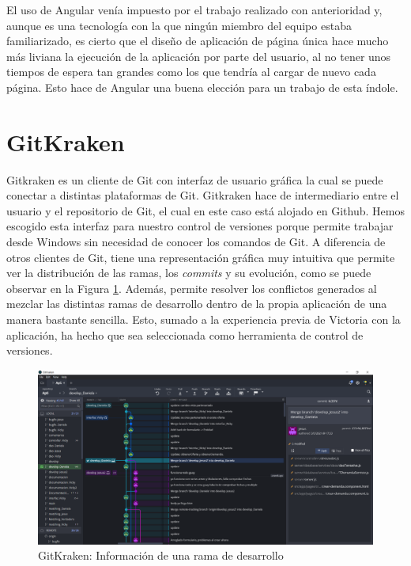 \documentclass[11pt]{book}
\begin{document}
	
	El uso de Angular venía impuesto por el trabajo realizado con anterioridad y, aunque es una tecnología con la que ningún miembro del equipo estaba familiarizado, es cierto que el diseño de aplicación de página única hace mucho más liviana la ejecución de la aplicación por parte del usuario, al no tener unos tiempos de espera tan grandes como los que tendría al cargar de nuevo cada página. Esto hace de Angular una buena elección para un trabajo de esta índole.
	
	\section{GitKraken}
	Gitkraken es un cliente de Git con interfaz de usuario gráfica la cual se puede conectar a distintas plataformas de Git. Gitkraken hace de intermediario entre el usuario y el repositorio de Git, el cual en este caso está alojado en Github. Hemos escogido esta interfaz para nuestro control de versiones porque permite trabajar desde Windows sin necesidad de conocer los comandos de Git. A diferencia de otros clientes de Git, tiene una representación gráfica muy intuitiva que permite ver la distribución de las ramas, los \emph{commits} y su evolución, como se puede observar en la Figura \ref{Figura 1}. Además, permite resolver los conflictos generados al mezclar las distintas ramas de desarrollo dentro de la propia aplicación de una manera bastante sencilla. Esto, sumado a la experiencia previa de Victoria con la aplicación, ha hecho que sea seleccionada como herramienta de control de versiones.
	\begin{figure}
		\centering
		\includegraphics[scale=0.4]{gitkraken}
		\caption{GitKraken: Información de una rama de desarrollo}
		\label{Figura 1}
	\end{figure}
	
\end{document}
